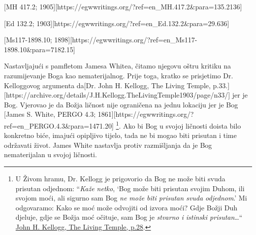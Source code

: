 [MH 417.2; 1905][https://egwwritings.org/?ref=en\_MH.417.2&para=135.2136]

[Ed 132.2; 1903][https://egwwritings.org/?ref=en\_Ed.132.2&para=29.636]

[Ms117-1898.10; 1898][https://egwwritings.org/?ref=en\_Ms117-1898.10&para=7182.15]

Nastavljajući s pamfletom Jamesa Whitea, čitamo njegovu oštru kritiku na razumijevanje Boga kao nematerijalnog. Prije toga, kratko se prisjetimo Dr. Kelloggovog argumenta da[Dr. John H. Kellogg, The Living Temple, p.33.][https://archive.org/details/J.H.Kellogg.TheLivingTemple1903/page/n33/] jer je Bog. Vjerovao je da Božja ličnost nije ograničena na jednu lokaciju jer je Bog [James S. White, PERGO 4.3; 1861][https://egwwritings.org/?ref=en\_PERGO.4.3&para=1471.20] \footnote{U Živom hramu, Dr. Kellogg je prigovorio da Bog ne može biti svuda prisutan odjednom: “\textit{Kaže netko}, ‘Bog može biti prisutan svojim Duhom, ili svojom moći, ali sigurno sam Bog \textit{ne može biti prisutan svuda odjednom}.’ Mi odgovaramo: Kako se moć može odvojiti od izvora moći? Gdje Božji Duh djeluje, gdje se Božja moć očituje, sam Bog je \textit{stvarno i istinski prisutan}…“ \href{https://archive.org/details/J.H.Kellogg.TheLivingTemple1903/page/n29/}{John H. Kellogg, The Living Temple, p.28}.}. Ako bi Bog u svojoj ličnosti doista bilo konkretno biće, imajući opipljivo tijelo, tada ne bi mogao biti prisutan  i time održavati život. James White nastavlja protiv razmišljanja da je Bog nematerijalan u svojoj ličnosti.

